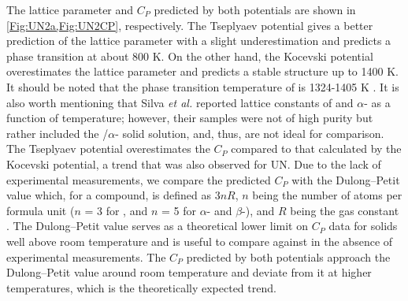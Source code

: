 \documentclass[preprint, 12pt]{elsarticle}
\begin{document}
The  lattice parameter and $C_P$ predicted by both potentials are shown in \cref{Fig:UN2a,Fig:UN2CP}, respectively. The Tseplyaev potential gives a better prediction of the  lattice parameter with a slight underestimation and predicts a phase transition at about 800 K. On the other hand, the Kocevski potential overestimates the  lattice parameter and predicts a stable  structure up to 1400 K. It should be noted that the phase transition temperature of  is 1324-1405 K \cite{Uno2020, Okamoto1997}. It is also worth mentioning that Silva \textit{et al.} \cite{Silva2009} reported lattice constants of  and $\alpha$- as a function of temperature; however, their samples were not of high purity but rather included the /$\alpha$- solid solution, and, thus, are not ideal for comparison. The Tseplyaev potential overestimates the  $C_P$ compared to that calculated by the Kocevski potential, a trend that was also observed for UN. Due to the lack of experimental measurements, we compare the predicted $C_P$ with the Dulong–Petit value which, for a compound, is defined as $3 n R$, $n$ being the number of atoms per formula unit ($n$ = 3 for , and $n$ = 5 for $\alpha$- and $\beta$-), and $R$ being the gas constant \cite{White2015}. The Dulong–Petit value serves as a theoretical lower limit on $C_P$ data for solids well above room temperature and is useful to compare against in the absence of experimental measurements. The  $C_P$ predicted by both potentials approach the Dulong–Petit value around room temperature and deviate from it at higher temperatures, which is the theoretically expected trend.
\end{document}
